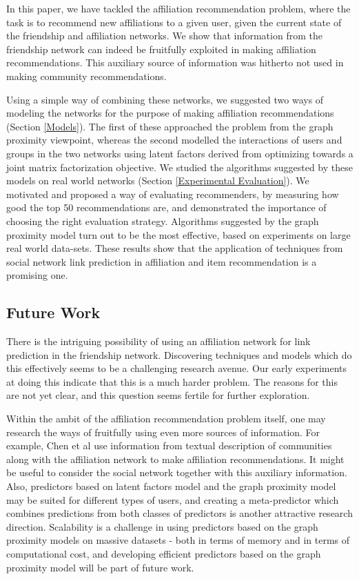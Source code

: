 In this paper, we have tackled the affiliation recommendation problem, where the task is to recommend new affiliations to a given user, given the current state of the friendship and affiliation networks. We show that information from the friendship network can indeed be fruitfully exploited in making affiliation recommendations. This auxiliary source of information was hitherto not used in making community recommendations.

Using a simple way of combining these networks, we suggested two ways of modeling the networks for the purpose of making affiliation recommendations (Section \ref{Models}). The first of these approached the problem from the graph proximity viewpoint, whereas the second modelled the interactions of users and groups in the two networks using latent factors derived from optimizing towards a joint matrix factorization objective. We studied the algorithms suggested by these models on real world networks (Section \ref{Experimental Evaluation}). We motivated and proposed a way of evaluating recommenders, by measuring how good the top 50 recommendations are, and demonstrated the importance of choosing the right evaluation strategy. Algorithms suggested by the graph proximity model turn out to be the most effective, based on experiments on large real world data-sets. These results show that the application of techniques from social network link prediction in affiliation and item recommendation is a promising one.

\subsection{Future Work}
There is the intriguing possibility of using an affiliation network for link prediction in the friendship network. Discovering techniques and models which do this effectively seems to be a challenging research avenue. Our early experiments at doing this indicate that this is a much harder problem. The reasons for this are not yet clear, and this question seems fertile for further exploration.

Within the ambit of the affiliation recommendation problem itself, one may research the ways of fruitfully using even more sources of information. For example, Chen et al\cite{GoogleCCF} use information from textual description of communities along with the affiliation network to make affiliation recommendations. It might be useful to consider the social network together with this auxiliary information. Also, predictors based on latent factors model and the graph proximity model may be suited for different types of users, and creating a meta-predictor which combines predictions from both classes of predictors is another attractive research direction. Scalability is a challenge in using predictors based on the graph proximity models on massive datasets - both in terms of memory and in terms of computational cost\cite{savas10c}, and developing efficient predictors based on the graph proximity model will be part of future work.
